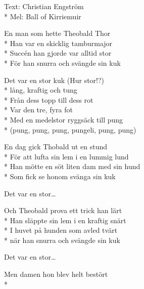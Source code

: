 \begin{SongText}
    \begin{SongInfo}
        Text: Christian Engström\\*%
        Mel: Ball of Kirriemuir
    \end{SongInfo}
    \begin{SongVerse}
        En man som hette Theobald Thor\\*%
        Han var en skicklig tamburmajor\\*%
        Succén han gjorde var alltid stor\\*%
        För han snurra och svängde sin kuk
    \end{SongVerse}
    \begin{SongVerse}
        Det var en stor kuk (Hur stor!?)\\*%
        lång, kraftig och tung\\*%
        Från dess topp till dess rot\\*%
        Var den tre, fyra fot\\*%
        Med en medelstor ryggsäck till pung\\*%
        (pung, pung, pung, pungeli,  pung, pung)
    \end{SongVerse}
    \begin{SongVerse}
        En dag gick Thobald ut en stund\\*%
        För att lufta sin lem i en lummig lund\\*%
        Han mötte en söt liten dam med sin hund\\*%
        Som fick se honom svänga sin kuk
    \end{SongVerse}
    \begin{SongVerse}
        Det var en stor…
    \end{SongVerse}
    \begin{SongVerse}
        Och Theobald prova ett trick han lärt\\*%
        Han släppte sin lem i en kraftig snärt\\*%
        I huvet på hunden som avled tvärt\\*%
        när han snurra och svängde sin kuk
    \end{SongVerse}
    \begin{SongVerse}
        Det var en stor…
    \end{SongVerse}
    \begin{SongVerse}
        Men damen hon blev helt bestört\\*%

\end{SongVerse}
\end{SongText}
